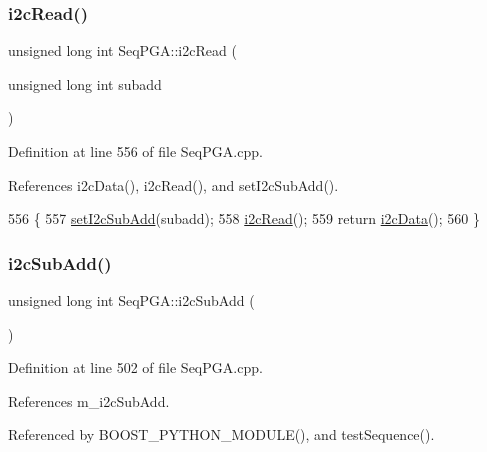 \mbox{\label{classSeqPGA_a9cf54d57d77b04f54cc0fe516c3528b4}} 
\subsubsection{\texorpdfstring{i2c\+Read()}{i2cRead()}\hspace{0.1cm}{\footnotesize\ttfamily [2/2]}}
{\footnotesize\ttfamily unsigned long int Seq\+P\+G\+A\+::i2c\+Read (\begin{DoxyParamCaption}\item[{unsigned long int}]{subadd }\end{DoxyParamCaption})}



Definition at line 556 of file Seq\+P\+G\+A.\+cpp.



References i2c\+Data(), i2c\+Read(), and set\+I2c\+Sub\+Add().


\begin{DoxyCode}
556                                                          \{
557   \hyperlink{classSeqPGA_a348c5d982223fb5cf2878e5bf3c6429c}{setI2cSubAdd}(subadd);
558   \hyperlink{classSeqPGA_a7cd344df2be99f3a02b487f80e87b27e}{i2cRead}();
559   \textcolor{keywordflow}{return} \hyperlink{classSeqPGA_a5e48f7b7ca1ada5a1decc0436dda4b26}{i2cData}();
560 \}
\end{DoxyCode}
\mbox{\label{classSeqPGA_a6c7137f9b45a20ecfcccf1d47e5af985}} 
\subsubsection{\texorpdfstring{i2c\+Sub\+Add()}{i2cSubAdd()}}
{\footnotesize\ttfamily unsigned long int Seq\+P\+G\+A\+::i2c\+Sub\+Add (\begin{DoxyParamCaption}{ }\end{DoxyParamCaption})}



Definition at line 502 of file Seq\+P\+G\+A.\+cpp.



References m\+\_\+i2c\+Sub\+Add.



Referenced by B\+O\+O\+S\+T\+\_\+\+P\+Y\+T\+H\+O\+N\+\_\+\+M\+O\+D\+U\+L\+E(), and test\+Sequence().


